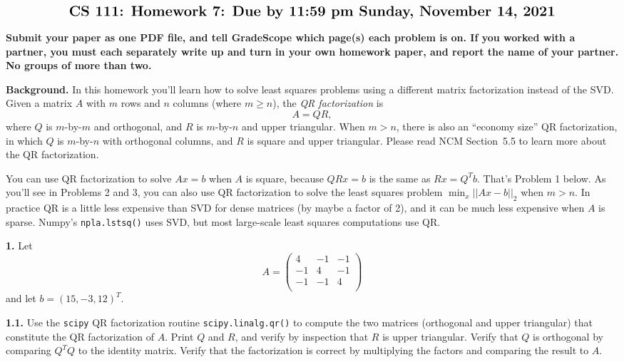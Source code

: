 \documentclass[11pt]{article}
\begin{document}
$$\mbox{\Large \bf CS 111: Homework 7: Due by 11:59 pm Sunday, November 14, 2021}$$
\par\smallskip\noindent
{\bf Submit your paper as one PDF file,
and tell GradeScope which page(s) each problem is on.
If you worked with a partner, 
you must each separately write up and turn in your own homework paper, 
and report the name of your partner.
No groups of more than two.
}

\par\bigskip
{\bf Background.}
In this homework you'll learn how to solve least squares problems using 
a different matrix factorization instead of the SVD.
Given a matrix $A$ with $m$ rows and $n$ columns (where $m \ge n$),
the {\em QR factorization} is
$$A = QR,$$
where $Q$ is $m$-by-$m$ and orthogonal, and $R$ is $m$-by-$n$ and upper triangular.
When $m>n$, there is also an ``economy size'' QR factorization,
in which $Q$ is $m$-by-$n$ with orthogonal columns, 
and $R$ is square and upper triangular.
Please read NCM Section~5.5 to learn more about the QR factorization.

You can use QR factorization to solve $Ax=b$ when $A$ is square,
because $QRx=b$ is the same as $Rx=Q^Tb$. That's Problem 1 below.
As you'll see in Problems 2 and 3, you can also use QR factorization
to solve the least squares problem $\min_x||Ax-b||_2$ when $m>n$.
In practice QR is a little less expensive than SVD for dense matrices
(by maybe a factor of 2), and it can be much less expensive when $A$ is sparse.
Numpy's {\tt npla.lstsq()} uses SVD, 
but most large-scale least squares computations use QR.

\par\bigskip
{\bf 1.}
Let
$$A =
   \left(
   \begin{array}{ccc}
    4 & -1 & -1 \\ 	
   -1 &  4 & -1 \\ 
   -1 & -1 &  4 \\
   \end{array} \right)
$$
and let $b = (15, -3, 12)^T$.

\par\medskip
{\bf 1.1.}
Use the {\tt scipy} QR factorization routine {\tt scipy.linalg.qr()}
to compute the two matrices (orthogonal and upper triangular) that
constitute the QR factorization of $A$.
Print $Q$ and $R$, and verify by inspection that $R$ is upper triangular.
Verify that $Q$ is orthogonal by comparing $Q^TQ$ to the identity matrix.
Verify that the factorization is correct by multiplying the factors and 
comparing the result to $A$.
\end{document}
